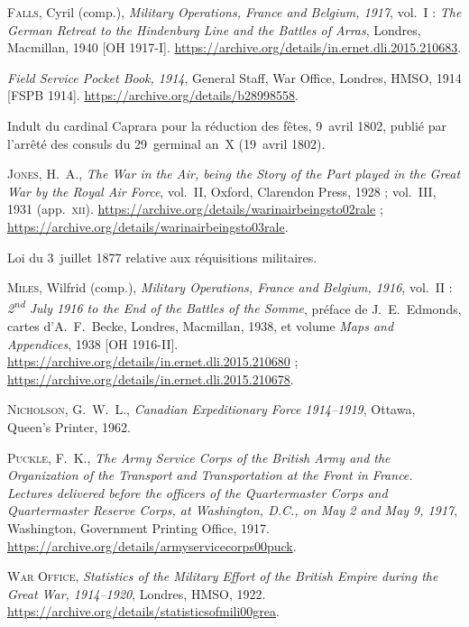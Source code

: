 \begin{biblist}
\item \textsc{Falls}, Cyril (comp.), \textit{Military Operations, France and Belgium, 1917}, vol.~I : \textit{The German Retreat to the Hindenburg Line and the Battles of Arras}, Londres, Macmillan, 1940 [OH 1917-I]. \url{https://archive.org/details/in.ernet.dli.2015.210683}.
\item \textit{Field Service Pocket Book, 1914}, General Staff, War Office, Londres, HMSO, 1914 [FSPB 1914]. \url{https://archive.org/details/b28998558}.
\item Indult du cardinal Caprara pour la réduction des fêtes, 9~avril 1802, publié par l'arrêté des consuls du 29~germinal an~X (19~avril 1802).
\item \textsc{Jones}, H.~A., \textit{The War in the Air, being the Story of the Part played in the Great War by the Royal Air Force}, vol.~II, Oxford, Clarendon Press, 1928 ; vol.~III, 1931 (app.~\textsc{xii}). \url{https://archive.org/details/warinairbeingsto02rale} ; \url{https://archive.org/details/warinairbeingsto03rale}.
\item Loi du 3~juillet 1877 relative aux réquisitions militaires.
\item \textsc{Miles}, Wilfrid (comp.), \textit{Military Operations, France and Belgium, 1916}, vol.~II : \textit{2\textsuperscript{nd} July 1916 to the End of the Battles of the Somme}, préface de J.~E.~Edmonds, cartes d'A.~F.~Becke, Londres, Macmillan, 1938, et volume \textit{Maps and Appendices}, 1938 [OH 1916-II]. \url{https://archive.org/details/in.ernet.dli.2015.210680} ; \url{https://archive.org/details/in.ernet.dli.2015.210678}.
\item \textsc{Nicholson}, G.~W.~L., \textit{Canadian Expeditionary Force 1914--1919}, Ottawa, Queen's Printer, 1962.
\item \textsc{Puckle}, F.~K., \textit{The Army Service Corps of the British Army and the Organization of the Transport and Transportation at the Front in France. Lectures delivered before the officers of the Quartermaster Corps and Quartermaster Reserve Corps, at Washington, D.C., on May 2 and May 9, 1917}, Washington, Government Printing Office, 1917. \url{https://archive.org/details/armyservicecorps00puck}.
\item \textsc{War Office}, \textit{Statistics of the Military Effort of the British Empire during the Great War, 1914--1920}, Londres, HMSO, 1922. \url{https://archive.org/details/statisticsofmili00grea}.
\end{biblist}

